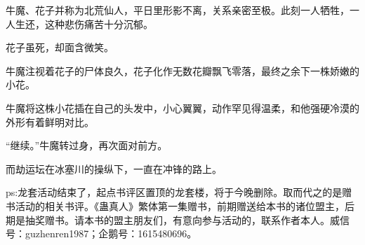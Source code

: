 \begin{this_body}
牛魔、花子并称为北荒仙人，平日里形影不离，关系亲密至极。此刻一人牺牲，一人生还，这种悲伤痛苦十分沉郁。

花子虽死，却面含微笑。

牛魔注视着花子的尸体良久，花子化作无数花瓣飘飞零落，最终之余下一株娇嫩的小花。

牛魔将这株小花插在自己的头发中，小心翼翼，动作罕见得温柔，和他强硬冷漠的外形有着鲜明对比。

“继续。”牛魔转过身，再次面对前方。

而劫运坛在冰塞川的操纵下，一直在冲锋的路上。

ps:龙套活动结束了，起点书评区置顶的龙套楼，将于今晚删除。取而代之的是赠书活动的相关书评。《蛊真人》繁体第一集赠书，前期赠送给本书的诸位盟主，后期是抽奖赠书。请本书的盟主朋友们，有意向参与活动的，联系作者本人。威信号：guzhenren1987；企鹅号：1615480696。

\end{this_body}

